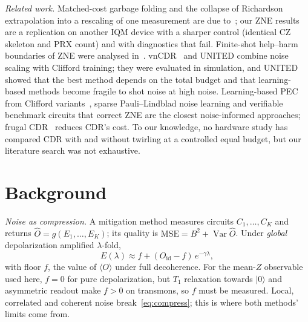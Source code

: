 \documentclass[conference]{IEEEtran}
\newcommand{\ev}[1]{\langle #1\rangle}
\newcommand{\ket}[1]{|#1\rangle}
\newcommand{\Oid}{O_{\mathrm{id}}}
\newcommand{\Var}{\operatorname{Var}}
\begin{document}
\emph{Related work.} Matched-cost garbage folding and the collapse of Richardson
extrapolation into a rescaling of one measurement are due to~\cite{koster2026}; our ZNE
results are a replication on another IQM device with a sharper control (identical CZ
skeleton and PRX count) and with diagnostics that fail. Finite-shot help--harm boundaries of
ZNE were analysed in~\cite{krebsbach2022,scavino2026}. vnCDR~\cite{lowe2021} and UNITED
\cite{bultrini2023} combine noise scaling with Clifford training; they were evaluated in
simulation, and UNITED showed that the best method depends on the total budget and that
learning-based methods become fragile to shot noise at high noise. Learning-based PEC from
Clifford variants~\cite{strikis2021}, sparse Pauli--Lindblad noise learning
\cite{vandenberg2023,kim2023} and verifiable benchmark circuits that correct ZNE
\cite{harris2026} are the closest noise-informed approaches; frugal CDR~\cite{czarnik2022}
reduces CDR's cost. To our knowledge, no hardware study has compared CDR with and without
twirling at a controlled equal budget, but our literature search was not exhaustive.

\section{Background}\label{sec:background}

\emph{Noise as compression.} A mitigation method measures circuits $C_1,\dots,C_K$ and
returns $\hat O=g(E_1,\dots,E_K)$; its quality is $\mathrm{MSE}=B^2+\Var\hat O$. Under
\emph{global} depolarization amplified $\lambda$-fold,
\begin{equation}
  E(\lambda)\approx f+(\Oid-f)\,e^{-\gamma\lambda},
  \label{eq:compress}
\end{equation}
with floor $f$, the value of $\ev{O}$ under full decoherence. For the mean-$Z$ observable used
here, $f=0$ for pure depolarization, but $T_1$ relaxation towards $\ket0$ and asymmetric
readout make $f>0$ on transmons, so $f$ must be measured. Local, correlated and coherent
noise break~\eqref{eq:compress}; this is where both methods' limits come from.
\end{document}
